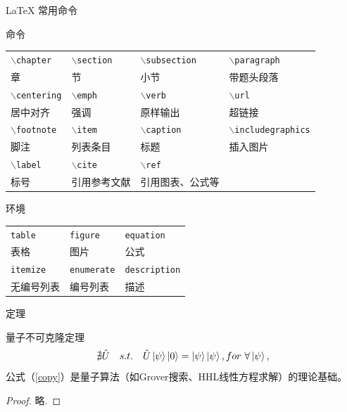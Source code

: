 \documentclass{beamer}
\def\cmd#1{\texttt{\color{red}\footnotesize $\backslash$#1}}
\def\env#1{\texttt{\color{blue}\footnotesize #1}}
\begin{document}
\begin{frame}[fragile]{\LaTeX{} 常用命令}
    \begin{exampleblock}{命令}
        \centering
        \footnotesize
        \begin{tabular}{llll}
            \cmd{chapter} & \cmd{section} & \cmd{subsection} & \cmd{paragraph} \\
            章 & 节 & 小节 & 带题头段落 \\\hline
            \cmd{centering} & \cmd{emph} & \cmd{verb} & \cmd{url} \\
            居中对齐 & 强调 & 原样输出 & 超链接 \\\hline
            \cmd{footnote} & \cmd{item} & \cmd{caption} & \cmd{includegraphics} \\
            脚注 & 列表条目 & 标题 & 插入图片 \\\hline
            \cmd{label} & \cmd{cite} & \cmd{ref} \\
            标号 & 引用参考文献 & 引用图表、公式等\\\hline
        \end{tabular}
    \end{exampleblock}
    \begin{exampleblock}{环境}
        \centering
        \footnotesize
        \begin{tabular}{lll}
            \env{table} & \env{figure} & \env{equation}\\
            表格 & 图片 & 公式 \\\hline
            \env{itemize} & \env{enumerate} & \env{description}\\
            无编号列表 & 编号列表 & 描述 \\
            \hline
        \end{tabular}
    \end{exampleblock}
\end{frame}

\begin{frame}{定理}
    \begin{theorem}{量子不可克隆定理}
        \begin{equation}
            \label{copy}
            \nexists \hat{U} \quad s.t. \quad \hat{U}\ket{\psi}\ket{0}=\ket{\psi}\ket{\psi}, for \ \forall\ket{\psi},
        \end{equation}
        公式（\ref{copy}）是量子算法（如Grover搜索、HHL线性方程求解）的理论基础。
    \end{theorem}
    \begin{proof}
        略.
    \end{proof}
\end{frame}
\end{document}
